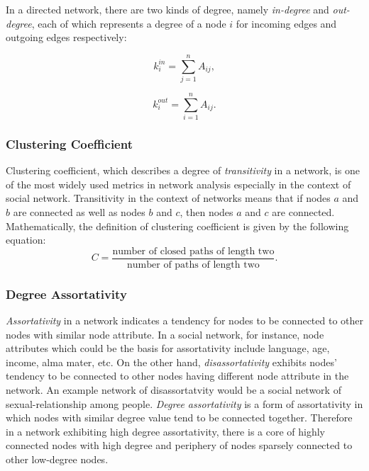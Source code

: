 \documentclass{article}
\begin{document}
	In a directed network, there are two kinds of degree, namely \textit{in-degree} and \textit{out-degree}, each of which represents a degree of a node $i$ for incoming edges and outgoing edges respectively:
	
	\begin{equation}
 	 k_i^{in} = \sum_{j = 1}^n A_{ij},
	\end{equation}
	
	\begin{equation}
 	 k_i^{out} = \sum_{i = 1}^n A_{ij}.
	\end{equation}

	
	\subsubsection{Clustering Coefficient}
	Clustering coefficient, which describes a degree of \textit{transitivity} in a network, is one of the most widely used metrics in network analysis especially in the context of social network. Transitivity in the context of networks means that if nodes $a$ and $b$ are connected as well as nodes $b$ and $c$, then nodes $a$ and $c$ are connected. Mathematically, the definition of clustering coefficient is given by the following equation:
	\begin{equation}
	C = \frac{\text{number of closed paths of length two}}{\text{number of paths of length two}}.
	\end{equation}

	\subsubsection{Degree Assortativity}
	\textit{Assortativity} in a network indicates a tendency for nodes to be connected to other nodes with similar node attribute. In a social network, for instance, node attributes which could be the basis for assortativity include language, age, income, alma mater, etc. On the other hand, \textit{disassortativity} exhibits nodes' tendency to be connected to other nodes having different node attribute in the network. An example network of disassortatvity would be a social network of sexual-relationship among people. 
	\textit{Degree assortativity} is a form of assortativity in which nodes with similar degree value tend to be connected together. Therefore in a network exhibiting high degree assortativity, there is a core of highly connected nodes with high degree and periphery of nodes sparsely connected to other low-degree nodes.
	
\end{document}
